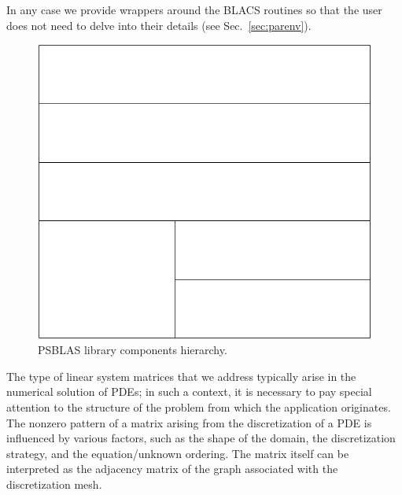 In any case we provide wrappers around the BLACS routines so that the
user does not need to delve into their details (see Sec.~\ref{sec:parenv}).

\begin{figure}[h] \begin{center}
\includegraphics[scale=0.45]{figures/psblas}
\end{center}
\caption{PSBLAS library components hierarchy.\label{fig:psblas}}
\end{figure}


The type of linear system matrices that we address  typically arise in the
numerical solution of PDEs;  in such a context,
it is necessary to pay special attention to the
structure of the problem from which the application originates. 
The nonzero pattern of a matrix arising from the
discretization of a PDE is influenced by various factors, such as the
shape of the  domain, the discretization strategy, and
the equation/unknown ordering. The matrix itself can be interpreted as
the  adjacency matrix of the graph associated with the discretization
mesh. 

